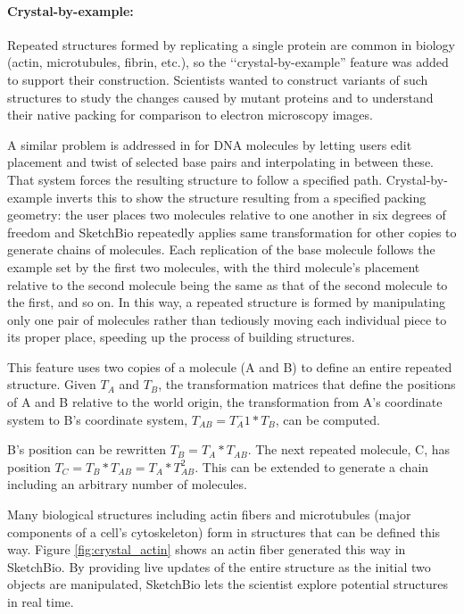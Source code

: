 \documentclass[twocolumn]{bmcart}%
\begin{document}
\paragraph*{Crystal-by-example:}
Repeated structures formed by replicating a single protein are common in biology (actin, microtubules, fibrin, etc.), so the `‘crystal-by-example'' feature was added to support their construction.
Scientists wanted to construct variants of such structures to study the changes caused by mutant proteins and to understand their native packing for comparison to electron microscopy images.

A similar problem is addressed in \cite{hornus2013easy} for DNA molecules by letting users edit placement and twist of selected base pairs and interpolating in between these.  That system forces the resulting structure to follow a specified path.
Crystal-by-example inverts this to show the structure resulting from a specified packing geometry: the user places two molecules relative to one another in six degrees of freedom and SketchBio repeatedly applies same transformation for other copies to generate chains of molecules.
Each replication of the base molecule follows the example set by the first two molecules, with the third molecule's placement relative to the second molecule being the same as that of the second molecule to the first, and so on.
In this way, a repeated structure is formed by manipulating only one pair of molecules rather than tediously moving each individual piece to its proper place, speeding up the process of building structures.

This feature uses two copies of a molecule (A and B) to define an entire repeated structure.
Given $T_A$ and $T_B$, the transformation matrices that define the positions of A and B relative to the world origin, the transformation from A's coordinate system to B's coordinate system, $T_{AB} = T_A^-1*T_B$, can be computed.

B's position can be rewritten $T_B = T_A*T_{AB}$.  The next repeated molecule, C, has position $T_C = T_B*T_{AB} = T_A*T_{AB}^2$.
This can be extended to generate a chain including an arbitrary number of molecules.

Many biological structures including actin fibers and microtubules (major components of a cell's cytoskeleton) form in structures that can be defined this way.
Figure \ref{fig:crystal_actin} shows an actin fiber generated this way in SketchBio.
By providing live updates of the entire structure as the initial two objects are manipulated, SketchBio lets the scientist explore potential structures in real time.
\end{document}
